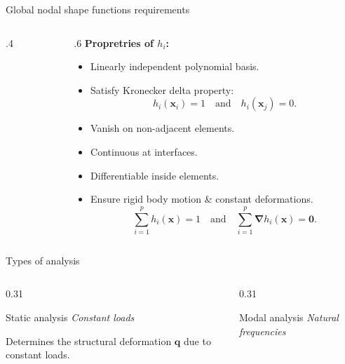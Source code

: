 \documentclass[aspectratio=169]{beamer}
\begin{document}
{{\begin{frame}{Global nodal shape functions requirements}
\begin{columns}[T]
\begin{column}{.4\textwidth}
\begin{center}
\begin{tikzpicture}[scale=2]
            \end{tikzpicture}
          \end{center}
        \end{column}
        \begin{column}{.6\textwidth}
          \textbf{Propretries of $h_i$:}
          \begin{itemize}
            \item Linearly independent polynomial basis.
            \item Satisfy Kronecker delta property:
                  $$ h_i(\mathbf{x}_i) = 1\quad\text{and} \quad h_i(\mathbf{x}_j) = 0.$$
            \item Vanish on non-adjacent elements.
            \item Continuous at interfaces.
            \item Differentiable inside elements.
            \item Ensure rigid body motion \& constant deformations.\vspace{-0.1cm}
                  $$\sum_{i=1}^{p}h_{i}(\mathbf x)=1 \quad\text{and}\quad \sum_{i=1}^{p}\boldsymbol\nabla h_{i}(\mathbf x)=\mathbf 0.$$
          \end{itemize}
        \end{column}
      \end{columns}
    \end{frame}

    \begin{frame}{Types of analysis}
      \begin{columns}[T,onlytextwidth]
        \begin{column}{0.31\textwidth}
          \begin{block}{Static analysis}
            \centering
            \small
            \emph{Constant loads}

            \vspace{0.25cm}

            Determines the structural deformation
            $\mathbf q$ due to constant loads.
          \end{block}
        \end{column}

        \begin{column}{0.31\textwidth}
          \begin{block}{Modal analysis}
            \centering
            \small
            \emph{Natural frequencies}


\end{block}
\end{column}
\end{columns}
\end{frame}}}
\end{document}
